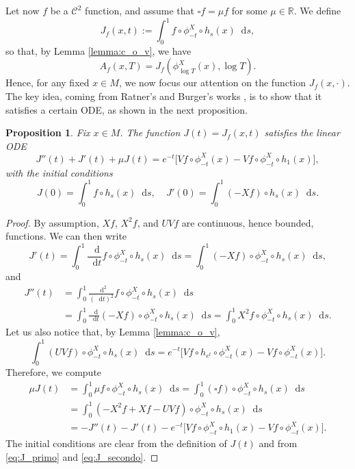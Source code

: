 \documentclass[JEP,XML,SOM,NoEqCountersInSection,Unicode,published]{cedram}
\newcommand \R{\mathbb{R}}
\newcommand*{\diff}{\mathop{}\!\mathrm{d}}
\newcommand{\aver}[1]{A_{#1}(x,T)}
\newtheorem {proposition}[theorem]{Proposition}
\theoremstyle{definition}
\begin{document}
Let now $f$ be a $\mathscr{C}^2$ function, and assume that $\square f = \mu f$ for some $\mu \in \R$.
We define
\[
J_f(x,t) := \int_0^1 f \circ \phi^X_{-t}\circ h_s(x) \diff s,
\]
so that, by Lemma \ref{lemma:c_o_v}, we have
\begin{equation}\label{eq:aver_equals_I}
\aver{f} = J_f(\phi^X_{\log T}(x), \log T).
\end{equation}
Hence, for any fixed $x \in M$, we now focus our attention on the function $J_f(x, \cdot)$.
The key idea, coming from Ratner's and Burger's works \cite{Rat1, Bur}, is to show that it satisfies a certain ODE, as shown in the next proposition.

\begin{proposition}\label{thm:eq_diff}
Fix $x \in M$. The function $J(t) = J_f(x,t) $ satisfies the linear ODE
\begin{equation*}
J''(t)+J'(t)+ \mu J(t) = e^{-t} \bigl[ Vf \circ \phi^X_{-t}(x) - Vf \circ \phi^X_{-t} \circ h_1(x) \bigr],
\end{equation*}
with the initial conditions
\[
J(0) = \int_0^1 f \circ h_s(x) \diff s,\ \ \ \ \ J'(0) = \int_0^1 (-Xf) \circ h_s(x) \diff s.
\]
\end{proposition}
\begin{proof}
By assumption, $Xf$, $X^2f$, and $UVf$ are continuous, hence bounded, functions.
We can then write
\begin{equation}\label{eq:J_primo}
J'(t) = \int_0^1 \frac{\diff}{\diff t} f\circ \phi^X_{-t}\circ h_s(x) \diff s = \int_0^1 (-Xf) \circ \phi^X_{-t}\circ h_s(x) \diff s,
\end{equation}
and
\begin{equation}\label{eq:J_secondo}
\begin{split}
J''(t) &= \int_0^1 \frac{\diff^2}{(\diff t)^2} f\circ \phi^X_{-t}\circ h_s(x) \diff s\\
&= \int_0^1 \frac{\diff}{\diff t} (-Xf)\circ \phi^X_{-t}\circ h_s(x) \diff s = \int_0^1 X^2f \circ \phi^X_{-t}\circ h_s(x) \diff s.
\end{split}
\end{equation}
Let us also notice that, by Lemma \ref{lemma:c_o_v},
\[
\int_0^1 (UVf) \circ \phi^X_{-t}\circ h_s(x) \diff s = e^{-t}\bigl[ Vf\circ h_{e^t} \circ \phi^X_{-t}(x) - Vf \circ \phi^X_{-t}(x)\bigr].
\]
Therefore, we compute
\begin{equation*}
\begin{split}
\mu J(t) &= \int_0^1 \mu f \circ \phi^X_{-t}\circ h_s(x) \diff s = \int_0^1 (\square f) \circ \phi^X_{-t}\circ h_s(x) \diff s \\
&= \int_0^1 (-X^2f+Xf -UVf) \circ \phi^X_{-t}\circ h_s(x) \diff s \\
&= - J''(t) -J'(t) - e^{-t}\bigl[ Vf \circ \phi^X_{-t}\circ h_{1}(x) - Vf \circ \phi^X_{-t}(x)\bigr].
\end{split}
\end{equation*}
The initial conditions are clear from the definition of $J(t)$ and from \eqref{eq:J_primo} and \eqref{eq:J_secondo}.
\end{proof}
\end{document}

